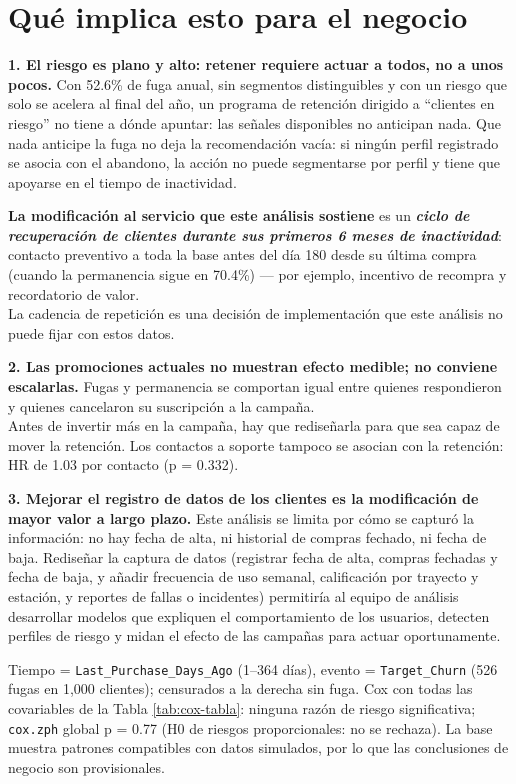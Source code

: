 \documentclass[
  10pt,
  titlepage]{article}
\begin{document}
\section{Qué implica esto para el negocio}\label{quuxe9-implica-esto-para-el-negocio}

\textbf{1. El riesgo es plano y alto: retener requiere actuar a todos, no a unos
pocos.} Con 52.6\% de fuga anual, sin segmentos
distinguibles y con un riesgo que solo se acelera al final del año, un programa de retención dirigido a
``clientes en riesgo'' no tiene a dónde apuntar: las señales disponibles no
anticipan nada. Que nada anticipe la fuga no deja la recomendación vacía: si
ningún perfil registrado se asocia con el abandono, la acción no puede
segmentarse por perfil y tiene que apoyarse en el tiempo de inactividad.

\textbf{La modificación al servicio que este análisis sostiene} es un
\textbf{\emph{ciclo de recuperación de clientes durante sus primeros 6
meses de inactividad}}: contacto preventivo a toda la base antes del día
180 desde su última compra (cuando la permanencia sigue en
70.4\%) --- por ejemplo, incentivo de recompra y recordatorio de valor.\\
La cadencia de repetición es una decisión de implementación que este
análisis no puede fijar con estos datos.

\textbf{2. Las promociones actuales no muestran efecto medible; no conviene
escalarlas.} Fugas y permanencia se comportan igual entre quienes respondieron
y quienes cancelaron su suscripción a la campaña.\\
Antes de invertir más en la campaña, hay que rediseñarla para que sea capaz de mover la
retención. Los contactos a soporte tampoco se asocian con la retención: HR de
1.03 por contacto (p = 0.332).

\textbf{3. Mejorar el registro de datos de los clientes es la modificación de mayor valor
a largo plazo.} Este análisis se limita por cómo se capturó la información: no
hay fecha de alta, ni historial de compras fechado, ni fecha de baja. Rediseñar la
captura de datos (registrar fecha de alta, compras fechadas y fecha de baja, y
añadir frecuencia de uso semanal, calificación por trayecto y estación, y reportes
de fallas o incidentes) permitiría al equipo de análisis desarrollar modelos que
expliquen el comportamiento de los usuarios, detecten perfiles de riesgo y midan
el efecto de las campañas para actuar oportunamente.

\enlargethispage{1.3cm}

\begin{notatecnica}
  Tiempo = \texttt{Last\_Purchase\_Days\_Ago} (1–364 días), evento = \texttt{Target\_Churn} (526 fugas en 1,000 clientes); censurados a la derecha sin fuga. Cox con todas las covariables de la Tabla \ref{tab:cox-tabla}: ninguna razón de riesgo significativa; \texttt{cox.zph} global p = 0.77 (H0 de riesgos proporcionales: no se rechaza). La base muestra patrones compatibles con datos simulados, por lo que las conclusiones de negocio son provisionales.
\end{notatecnica}
\end{document}
